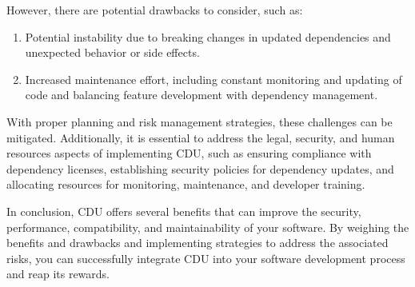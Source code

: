 \documentclass[10pt]{article}
\begin{document}
However, there are potential drawbacks to consider, such as:

\begin{enumerate}

  \item Potential instability due to breaking changes in updated dependencies and unexpected behavior or side effects.

  \item Increased maintenance effort, including constant monitoring and updating of code and balancing feature development with dependency management.

\end{enumerate}

With proper planning and risk management strategies, these challenges can be mitigated. Additionally, it is essential to address the legal, security, and human resources aspects of implementing CDU, such as ensuring compliance with dependency licenses, establishing security policies for dependency updates, and allocating resources for monitoring, maintenance, and developer training.

In conclusion, CDU offers several benefits that can improve the security, performance, compatibility, and maintainability of your software. By weighing the benefits and drawbacks and implementing strategies to address the associated risks, you can successfully integrate CDU into your software development process and reap its rewards.
\end{document}
